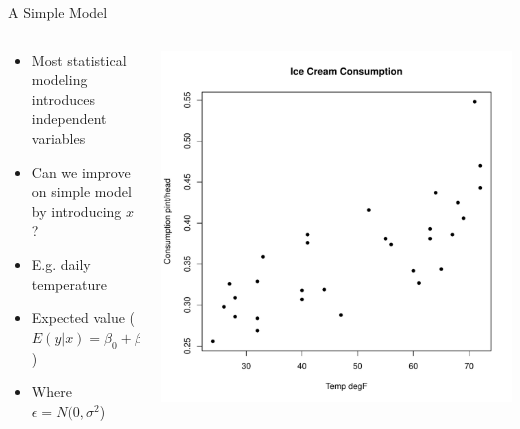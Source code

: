 \documentclass[aspectratio=169]{beamer}\usepackage[]{graphicx}\usepackage[]{color}
\makeatletter
\def\maxwidth{ %
  \ifdim\Gin@nat@width>\linewidth
    \linewidth
  \else
    \Gin@nat@width
  \fi
}
\newenvironment{knitrout}{}{} %
\makeatother
\begin{document}
\begin{frame}{A Simple Model}
\begin{columns}
  \begin{column}{0.5\textwidth}
		\begin{itemize}
			\item Most statistical modeling introduces independent variables
			\item Can we improve on simple model by introducing $x$? 
			\item E.g. daily temperature
			\item Expected value ($E(y|x) = \beta_0 + \beta_1 x + \epsilon$)
			\item Where $\epsilon = N(0, \sigma^2$)
		\end{itemize}
	\end{column}
	\begin{column}{0.5\textwidth}
\begin{knitrout}\scriptsize
{}\color{fgcolor}
\includegraphics[width=\maxwidth]{figure/unnamed-chunk-2-1} 

\end{knitrout}
\end{column}
\end{columns}
\end{frame}
\end{document}
